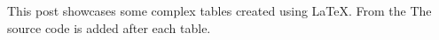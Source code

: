 This post showcases some complex tables created using LaTeX. From the  The source code is added after each table.

\newline
